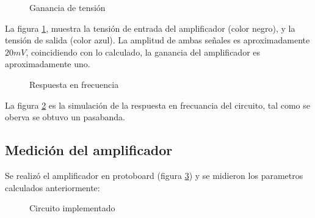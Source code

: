 \documentclass[../../main.tex]{subfiles}
\begin{document}
\begin{figure}[H]	
	\centering
	\caption{Ganancia de tensión}\label{fig:simgain}
\end{figure}
La figura \ref{fig:simgain}, muestra la tensión de entrada del amplificador (color negro), y la tensión de salida (color azul). La amplitud de ambas señales es aproximadamente $20mV$, coincidiendo con lo calculado, la ganancia del amplificador es aproximadamente uno.

\begin{figure}[H]	
	\centering
	\caption{Respuesta en frecuencia}\label{fig:simrtafrec}
\end{figure}
La figura \ref{fig:simrtafrec} es la simulación de la respuesta en frecuancia del circuito, tal como se oberva se obtuvo un pasabanda.

\subsection{Medición del amplificador}
Se realizó el amplificador en protoboard (figura \ref{fig:pro}) y se midieron los parametros calculados anteriormente:

\begin{figure}[H]	
	\centering
	\caption{Circuito implementado}\label{fig:pro}
\end{figure}
\end{document}
